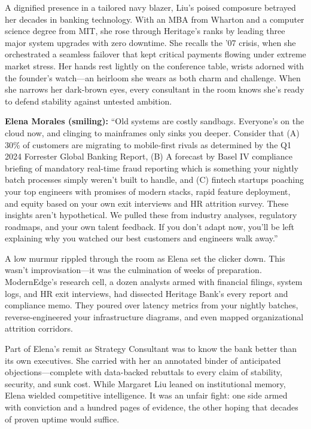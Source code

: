 A dignified presence in a tailored navy blazer, Liu’s poised composure betrayed  
her decades in banking technology. With an MBA from Wharton and a computer  
science degree from MIT, she rose through Heritage’s ranks by leading three  
major system upgrades with zero downtime. She recalls the ’07 crisis, when she  
orchestrated a seamless failover that kept critical payments flowing under  
extreme market stress. Her hands rest lightly on the conference table, wrists  
adorned with the founder’s watch—an heirloom she wears as both charm and  
challenge. When she narrows her dark-brown eyes, every consultant in the room  
knows she’s ready to defend stability against untested ambition.  

\textbf{Elena Morales (smiling):} “Old systems are costly sandbags. Everyone’s on  
the cloud now, and clinging to mainframes only sinks you deeper. Consider that  
  (A) 30\% of customers are migrating to mobile-first rivals as determined by 
  the Q1 2024 Forrester Global  Banking Report,   
  (B) A forecast by Basel IV  
        compliance briefing of mandatory real-time fraud reporting which is 
        something your  
        nightly batch processes simply weren’t built to handle, and
  (C) fintech startups poaching your top engineers with  
        promises of modern stacks, rapid feature deployment, and equity 
        based on your own exit interviews and HR attrition survey.  
These insights aren’t hypothetical. We pulled these from industry analyses,  
regulatory roadmaps, and your own talent feedback. If you don’t adapt now, you'll
be left explaining why you watched our best customers and engineers walk away.”  

A low murmur rippled through the room as Elena set the clicker down. This wasn’t  
improvisation—it was the culmination of weeks of preparation. ModernEdge’s  
research cell, a dozen analysts armed with financial filings, system logs, and  
HR exit interviews, had dissected Heritage Bank’s every report and compliance  
memo. They poured over latency metrics from your nightly batches, reverse-engineered  
your infrastructure diagrams, and even mapped organizational attrition corridors.

Part of Elena’s remit as Strategy Consultant was to know the bank better than its  
own executives. She carried with her an annotated binder of anticipated  
objections—complete with data-backed rebuttals to every claim of stability,  
security, and sunk cost. While Margaret Liu leaned on institutional memory, Elena  
wielded competitive intelligence. It was an unfair fight: one side armed with  
conviction and a hundred pages of evidence, the other hoping that decades of  
proven uptime would suffice.  

